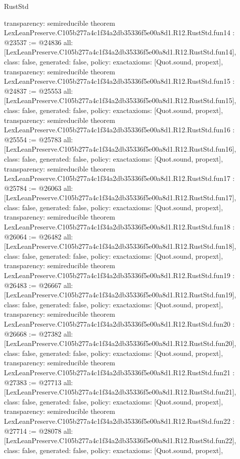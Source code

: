 \begin{lexlean}{RustStd}
\begin{coremodule}
{  transparency: semireducible
}
theorem LexLeanPreserve.C105b277a4c1f34a2db35336f5e00a8d1.R12.RustStd.fun14 : @23537 := @24836 {
  all: [LexLeanPreserve.C105b277a4c1f34a2db35336f5e00a8d1.R12.RustStd.fun14],
  class: false,
  generated: false,
  policy: exact{axioms: [Quot.sound, propext]},
  transparency: semireducible
}
theorem LexLeanPreserve.C105b277a4c1f34a2db35336f5e00a8d1.R12.RustStd.fun15 : @24837 := @25553 {
  all: [LexLeanPreserve.C105b277a4c1f34a2db35336f5e00a8d1.R12.RustStd.fun15],
  class: false,
  generated: false,
  policy: exact{axioms: [Quot.sound, propext]},
  transparency: semireducible
}
theorem LexLeanPreserve.C105b277a4c1f34a2db35336f5e00a8d1.R12.RustStd.fun16 : @25554 := @25783 {
  all: [LexLeanPreserve.C105b277a4c1f34a2db35336f5e00a8d1.R12.RustStd.fun16],
  class: false,
  generated: false,
  policy: exact{axioms: [Quot.sound, propext]},
  transparency: semireducible
}
theorem LexLeanPreserve.C105b277a4c1f34a2db35336f5e00a8d1.R12.RustStd.fun17 : @25784 := @26063 {
  all: [LexLeanPreserve.C105b277a4c1f34a2db35336f5e00a8d1.R12.RustStd.fun17],
  class: false,
  generated: false,
  policy: exact{axioms: [Quot.sound, propext]},
  transparency: semireducible
}
theorem LexLeanPreserve.C105b277a4c1f34a2db35336f5e00a8d1.R12.RustStd.fun18 : @26064 := @26482 {
  all: [LexLeanPreserve.C105b277a4c1f34a2db35336f5e00a8d1.R12.RustStd.fun18],
  class: false,
  generated: false,
  policy: exact{axioms: [Quot.sound, propext]},
  transparency: semireducible
}
theorem LexLeanPreserve.C105b277a4c1f34a2db35336f5e00a8d1.R12.RustStd.fun19 : @26483 := @26667 {
  all: [LexLeanPreserve.C105b277a4c1f34a2db35336f5e00a8d1.R12.RustStd.fun19],
  class: false,
  generated: false,
  policy: exact{axioms: [Quot.sound, propext]},
  transparency: semireducible
}
theorem LexLeanPreserve.C105b277a4c1f34a2db35336f5e00a8d1.R12.RustStd.fun20 : @26668 := @27382 {
  all: [LexLeanPreserve.C105b277a4c1f34a2db35336f5e00a8d1.R12.RustStd.fun20],
  class: false,
  generated: false,
  policy: exact{axioms: [Quot.sound, propext]},
  transparency: semireducible
}
theorem LexLeanPreserve.C105b277a4c1f34a2db35336f5e00a8d1.R12.RustStd.fun21 : @27383 := @27713 {
  all: [LexLeanPreserve.C105b277a4c1f34a2db35336f5e00a8d1.R12.RustStd.fun21],
  class: false,
  generated: false,
  policy: exact{axioms: [Quot.sound, propext]},
  transparency: semireducible
}
theorem LexLeanPreserve.C105b277a4c1f34a2db35336f5e00a8d1.R12.RustStd.fun22 : @27714 := @28078 {
  all: [LexLeanPreserve.C105b277a4c1f34a2db35336f5e00a8d1.R12.RustStd.fun22],
  class: false,
  generated: false,
  policy: exact{axioms: [Quot.sound, propext]},
}
\end{coremodule}
\end{lexlean}

